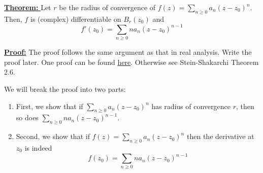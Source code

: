 \documentclass{article}
\newcommand{\C}{\mathbb{C}}
\begin{document}
\begin{dottedbox}
  \underline{\textbf{Theorem: }} Let $r$ be the radius of convergence of $f(z) = \sum_{n \geq 0} a_n (z - z_0)^n$. Then, $f$ is (complex) differentiable on $B_r(z_0)$ and 
  \[ f'(z_0) = \sum_{n \geq 0} n a_n (z - z_0)^{n-1} \]

  \vskip 0.5cm
  \underline{\textbf{Proof:}}
  The proof follows the same argument as that in real analysis. Write the proof later. One proof can be found \href{https://proofwiki.org/wiki/Derivative_of_Complex_Power_Series/Proof_1}{here}. Otherwise see Stein-Shakarchi Theorem 2.6.
\end{dottedbox}

We will break the proof into two parts:
\begin{enumerate}[label=(\alph*)]
  \item First, we show that if $\sum_{n \geq 0} a_n(z - z_0)^n$ has radius of convergence $r$, then so does $\sum_{n \geq 0} n a_n(z - z_0)^{n-1}$.
  \item Second, we show that if $f(z) = \sum_{n \geq 0} a_n(z - z_0)^n$ then the derivative at $z_0$ is indeed 
  \[ f(z_0) = \sum_{n \geq 0} n a_n(z - z_0)^{n-1} \]
\end{enumerate}






\end{document}
